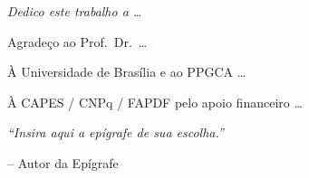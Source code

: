 \documentclass[
  12pt,
  openany,   %
  oneside,   %
  a4paper,
  english, brazil, sumario=tradicional
]{abntex2}
\newif\ifprojeto
\begin{document}
\ifprojeto\else
\begin{dedicatoria}
  \vspace*{\fill}
  \noindent\hfill
  \begin{minipage}{.5\textwidth}
    \itshape
    Dedico este trabalho a \ldots
  \end{minipage}
\end{dedicatoria}
\fi

\ifprojeto\else
\begin{agradecimentos}
  Agradeço ao Prof.\ Dr.\ \ldots

  À Universidade de Brasília e ao PPGCA \ldots

  À CAPES / CNPq / FAPDF pelo apoio financeiro \ldots
\end{agradecimentos}
\fi

\ifprojeto\else
\begin{epigrafe}
  \vspace*{\fill}
  \noindent\hfill
  \begin{minipage}{.5\textwidth}
    \SingleSpacing\itshape
    ``Insira aqui a epígrafe de sua escolha.''

    \normalfont -- Autor da Epígrafe
  \end{minipage}
\end{epigrafe}
\fi
\end{document}
